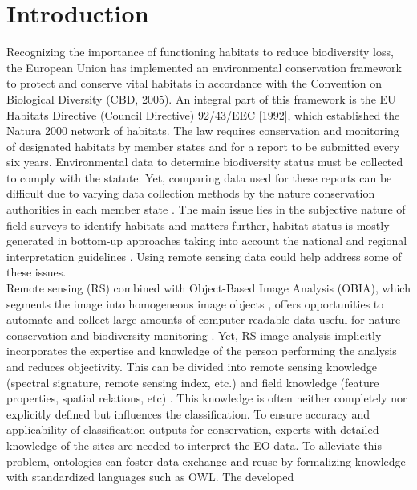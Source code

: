 \documentclass[authoryear, review,12pt,number]{elsarticle}
\begin{document}
\section{Introduction}  %
Recognizing the importance of functioning habitats to reduce biodiversity loss, 
the European Union has implemented an environmental conservation framework 
to protect and conserve vital habitats in accordance with the Convention 
on Biological Diversity (CBD, 2005). An integral part of this framework is the 
EU Habitats
Directive (Council Directive) 92/43/EEC [1992], which established the Natura
2000 network of habitats. The law requires conservation and monitoring of
designated habitats by member states and for a report to be submitted every six
years. Environmental data to determine biodiversity status must be collected to
comply with the statute. Yet, comparing data used for these reports can be
difficult due to varying data collection methods by the nature conservation
authorities in each member state \citep{INSPIREdataspecs, INSPIRE}. The main
issue lies in the subjective nature of field surveys to identify habitats
\citep{Cherrill1999, Cherrill1999a, Nieland2015} and  %
matters further, habitat status is mostly generated in bottom-up approaches
taking into account the national and regional interpretation guidelines
\citep{INSPIREdataspecs}. Using remote sensing data could help address some of
these issues.
\\
Remote sensing (RS) combined with Object-Based Image Analysis (OBIA), which
segments the image into homogeneous image objects \citep{Blaschke2010}, offers
opportunities to automate and collect large amounts of computer-readable data
useful for nature conservation and biodiversity monitoring \citep{Corbane2015,
VandenBorre2011, Mayer2011}. Yet, RS image analysis implicitly incorporates the
expertise and knowledge of the person performing the analysis and reduces
objectivity. This can be divided into remote sensing knowledge (spectral
signature, remote sensing index, etc.) and field knowledge (feature properties,
spatial relations, etc) \citep{Andres2013a}. This knowledge is often neither
completely nor explicitly defined but influences the classification. To ensure
accuracy and applicability of classification outputs for conservation, experts
with detailed knowledge of the sites are needed to interpret the EO data. To
alleviate this problem, ontologies can foster data exchange and reuse by
formalizing knowledge with standardized languages such as OWL. The developed
\end{document}
